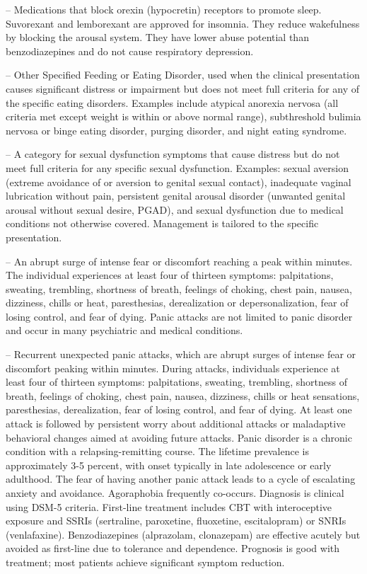 -- Medications that block orexin (hypocretin) receptors to promote sleep. Suvorexant and lemborexant are approved for insomnia. They reduce wakefulness by blocking the arousal system. They have lower abuse potential than benzodiazepines and do not cause respiratory depression.

-- Other Specified Feeding or Eating Disorder, used when the clinical presentation causes significant distress or impairment but does not meet full criteria for any of the specific eating disorders. Examples include atypical anorexia nervosa (all criteria met except weight is within or above normal range), subthreshold bulimia nervosa or binge eating disorder, purging disorder, and night eating syndrome.

-- A category for sexual dysfunction symptoms that cause distress but do not meet full criteria for any specific sexual dysfunction. Examples: sexual aversion (extreme avoidance of or aversion to genital sexual contact), inadequate vaginal lubrication without pain, persistent genital arousal disorder (unwanted genital arousal without sexual desire, PGAD), and sexual dysfunction due to medical conditions not otherwise covered. Management is tailored to the specific presentation.

-- An abrupt surge of intense fear or discomfort reaching a peak within minutes. The individual experiences at least four of thirteen symptoms: palpitations, sweating, trembling, shortness of breath, feelings of choking, chest pain, nausea, dizziness, chills or heat, paresthesias, derealization or depersonalization, fear of losing control, and fear of dying. Panic attacks are not limited to panic disorder and occur in many psychiatric and medical conditions.

-- Recurrent unexpected panic attacks, which are abrupt surges of intense fear or discomfort peaking within minutes. During attacks, individuals experience at least four of thirteen symptoms: palpitations, sweating, trembling, shortness of breath, feelings of choking, chest pain, nausea, dizziness, chills or heat sensations, paresthesias, derealization, fear of losing control, and fear of dying. At least one attack is followed by persistent worry about additional attacks or maladaptive behavioral changes aimed at avoiding future attacks. Panic disorder is a chronic condition with a relapsing-remitting course. The lifetime prevalence is approximately 3-5 percent, with onset typically in late adolescence or early adulthood. The fear of having another panic attack leads to a cycle of escalating anxiety and avoidance. Agoraphobia frequently co-occurs. Diagnosis is clinical using DSM-5 criteria. First-line treatment includes CBT with interoceptive exposure and SSRIs (sertraline, paroxetine, fluoxetine, escitalopram) or SNRIs (venlafaxine). Benzodiazepines (alprazolam, clonazepam) are effective acutely but avoided as first-line due to tolerance and dependence. Prognosis is good with treatment; most patients achieve significant symptom reduction.


